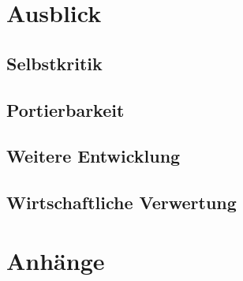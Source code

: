 \documentclass[11pt,ngerman,toc=listof,index=totoc]{scrreprt}
\begin{document}
\chapter{Ausblick}\label{ausblick}

\section{Selbstkritik}\label{selbstkritik}

\section{Portierbarkeit}\label{portierbarkeit}

\section{Weitere Entwicklung}\label{weitere-entwicklung}

\section{Wirtschaftliche Verwertung}\label{wirtschaftliche-verwertung}

\chapter{Anhänge}\label{anhuxe4nge}
\end{document}
